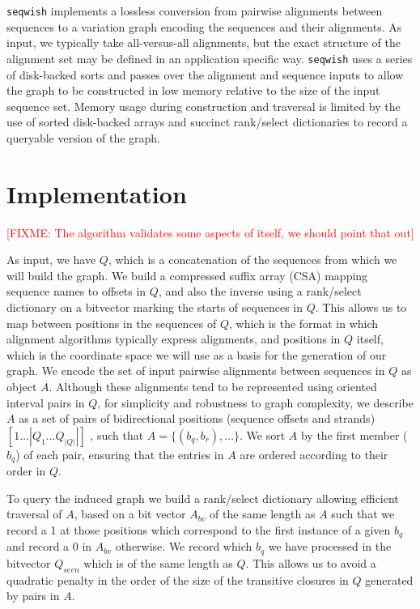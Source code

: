 \documentclass{bioinfo}
\newcommand{\red}[1]{{\textcolor{Red}{#1}}}
\newcommand{\FIXME}[1]{\red{[FIXME: #1]}}
\begin{document}
    \texttt{seqwish} implements a lossless conversion from pairwise alignments between sequences to a variation graph encoding the sequences and their alignments.
    As input, we typically take all-versus-all alignments, but the exact structure of the alignment set may be defined in an application specific way.
    \texttt{seqwish} uses a series of disk-backed sorts and passes over the alignment and sequence inputs to allow the graph to be constructed in low memory relative to the size of the input sequence set.
    Memory usage during construction and traversal is limited by the use of sorted disk-backed arrays and succinct rank/select dictionaries to record a queryable version of the graph.

    


    \section{Implementation}
    \label{sec:implementation}

    \FIXME{The algorithm validates some aspects of itself, we should point that out}

    As input, we have $Q$, which is a concatenation of the sequences from which we will build the graph.
    We build a compressed suffix array (CSA) mapping sequence names to offsets in $Q$, and also the inverse using a rank/select dictionary on a bitvector marking the starts of sequences in $Q$.
    This allows us to map between positions in the sequences of $Q$, which is the format in which alignment algorithms typically express alignments, and positions in $Q$ itself, which is the coordinate space we will use as a basis for the generation of our graph.
    We encode the set of input pairwise alignments between sequences in $Q$ as object $A$.
    Although these alignments tend to be represented using oriented interval pairs in $Q$, for simplicity and robustness to graph complexity, we describe $A$ as a set of pairs of bidirectional positions (sequence offsets and strands) $[1 \ldots |Q_1 \ldots Q_{|Q|}|]$ , such that $A = \{ (b_{q}, b_{r}), \ldots \}$.
    We sort $A$ by the first member ($b_{q}$) of each pair, ensuring that the entries in $A$ are ordered according to their order in $Q$.

    To query the induced graph we build a rank/select dictionary allowing efficient traversal of $A$, based on a bit vector $A_{bv}$ of the same length as $A$ such that we record a 1 at those positions which correspond to the first instance of a given $b_{q}$ and record a 0 in $A_{bv}$ otherwise.
    We record which $b_{q}$ we have processed in the bitvector $Q_{seen}$ which is of the same length as $Q$.
    This allows us to avoid a quadratic penalty in the order of the size of the transitive closures in $Q$ generated by pairs in $A$.
\end{document}
